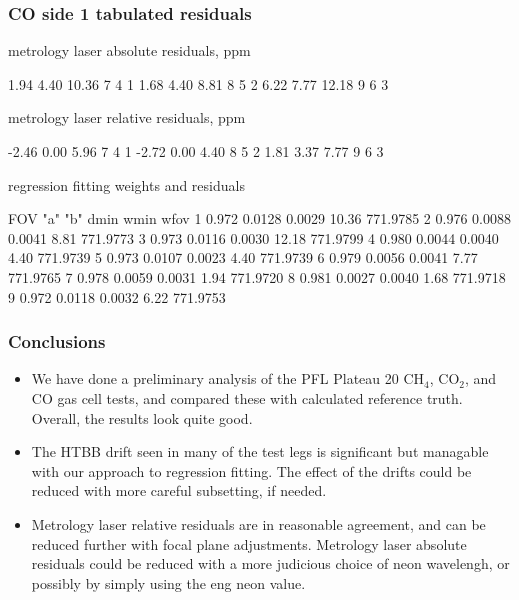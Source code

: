 \documentclass[10pt]{beamer}
\begin{document}
\begin{frame}[fragile]
\frametitle{CO side 1 tabulated residuals}

  metrology laser absolute residuals, ppm
\begin{semiverbatim}\scriptsize
      1.94     4.40    10.36         7   4   1
      1.68     4.40     8.81         8   5   2
      6.22     7.77    12.18         9   6   3
\end{semiverbatim}

  metrology laser relative residuals, ppm
\begin{semiverbatim}\scriptsize
     -2.46     0.00     5.96         7   4   1
     -2.72     0.00     4.40         8   5   2
      1.81     3.37     7.77         9   6   3
\end{semiverbatim}

     regression fitting weights and residuals
\begin{semiverbatim}\scriptsize
 FOV   "a"       "b"     dmin     wmin      wfov
  1   0.972    0.0128   0.0029    10.36   771.9785 
  2   0.976    0.0088   0.0041     8.81   771.9773 
  3   0.973    0.0116   0.0030    12.18   771.9799 
  4   0.980    0.0044   0.0040     4.40   771.9739 
  5   0.973    0.0107   0.0023     4.40   771.9739 
  6   0.979    0.0056   0.0041     7.77   771.9765 
  7   0.978    0.0059   0.0031     1.94   771.9720 
  8   0.981    0.0027   0.0040     1.68   771.9718 
  9   0.972    0.0118   0.0032     6.22   771.9753 
\end{semiverbatim}

\end{frame}
\begin{frame}
\frametitle{Conclusions}
\begin{itemize}

  \item We have done a preliminary analysis of the PFL Plateau 20
    CH$_4$, CO$_2$, and CO gas cell tests, and compared these with
    calculated reference truth.  Overall, the results look quite
    good.

  \item The HTBB drift seen in many of the test legs is significant
    but managable with our approach to regression fitting.   The effect
    of the drifts could be reduced with more careful subsetting, if
    needed.

  \item Metrology laser relative residuals are in reasonable
    agreement, and can be reduced further with focal plane
    adjustments.  Metrology laser absolute residuals could be
    reduced with a more judicious choice of neon wavelengh, or 
    possibly by simply using the eng neon value.

\end{itemize}
\end{frame}
\end{document}
